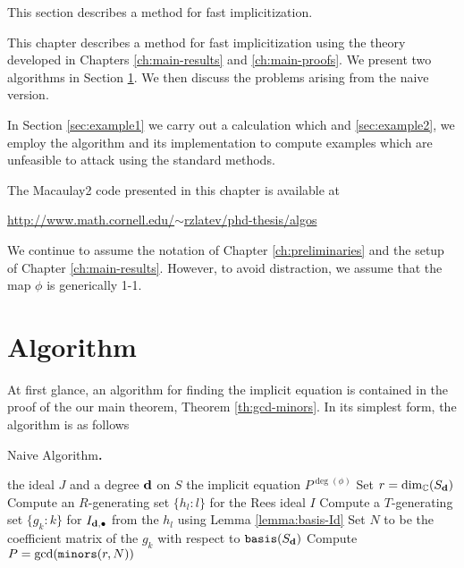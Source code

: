 \documentclass[fleqn,reqno]{amsart}
\newcounter{chapter}
\numberwithin{first}{chapter}
\begin{document}

\begin{paragraf*}
This section describes a method for fast implicitization.
\end{paragraf*}

\begin{paragraf*}
This chapter describes a method for fast implicitization using
the theory developed in Chapters \ref{ch:main-results} and \ref{ch:main-proofs}.
We present two algorithms in Section \ref{sec:algorithm}.
We then discuss the problems arising from the naive version.

In Section \ref{sec:example1} we carry out a calculation which 
and \ref{sec:example2},
we employ the algorithm and its implementation to compute examples which are unfeasible
to attack using the standard methods.
\end{paragraf*}

\begin{paragraf*}
The Macaulay2 code presented in this chapter is available at
\begin{center}
	\href{http://www.math.cornell.edu/~rzlatev/phd-thesis/algos}
	{\ttten http://www.math.cornell.edu/$\sim$rzlatev/phd-thesis/algos}
\end{center}
\end{paragraf*}

\begin{paragraf*}
We continue to assume the notation of Chapter \ref{ch:preliminaries}
and the setup of Chapter \ref{ch:main-results}.
However, to avoid distraction, we assume that the map $\phi$ is generically 1-1.
\end{paragraf*}



\section{Algorithm}
\label{sec:algorithm}

\begin{paragraf*}
At first glance, an algorithm for finding the implicit equation is contained in the proof
of the our main theorem, Theorem \ref{th:gcd-minors}.
In its simplest form, the algorithm is as follows
\end{paragraf*}

\begin{algorithm} {\sc Naive Algorithm\bf.}
\label{algo:naive}
\begin{algorithmic}
   the ideal $J$ and a degree $\mathbf d$ on $S$
   the implicit equation $P^{\deg(\phi)}$
  \State Set $r=\dim_{\mathbb{C}}(S_{\mathbf d})$
  \State Compute an $R$-generating set $\{h_l:l\}$ for the Rees ideal $I$
  \State Compute a $T$-generating set $\{g_k:k\}$ for $I_{\mathbf d,\bullet}$ from the $h_l$
  	using Lemma \ref{lemma:basis-Id}
  \State Set $N$ to be the coefficient matrix of the $g_k$ with respect to $\mathop{\tt basis}(S_\mathbf d)$
  \State Compute $P=\gcd(\mathop{\tt minors}(r,N))$
\end{algorithmic}
\end{algorithm}
\end{document}
